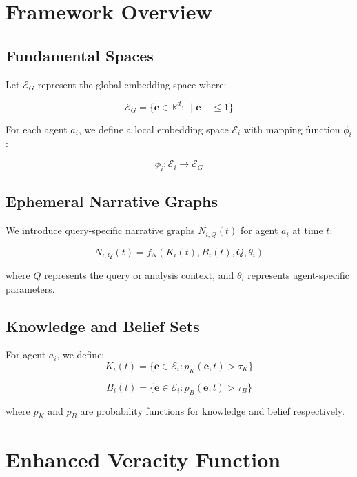 \documentclass[12pt, a4paper]{article}
\begin{document}
\section{Framework Overview}
\subsection{Fundamental Spaces}
Let $\mathcal{E}_G$ represent the global embedding space where:

\begin{equation}
\mathcal{E}_G = \{\mathbf{e} \in \mathbb{R}^d : \|\mathbf{e}\| \leq 1\}
\end{equation}

For each agent $a_i$, we define a local embedding space $\mathcal{E}_i$ with mapping function $\phi_i$:

\begin{equation}
\phi_i: \mathcal{E}_i \rightarrow \mathcal{E}_G
\end{equation}

\subsection{Ephemeral Narrative Graphs}
We introduce query-specific narrative graphs $N_{i,Q}(t)$ for agent $a_i$ at time $t$:

\begin{equation}
N_{i,Q}(t) = f_N(K_i(t), B_i(t), Q, \theta_i)
\end{equation}

where $Q$ represents the query or analysis context, and $\theta_i$ represents agent-specific parameters.

\subsection{Knowledge and Belief Sets}
For agent $a_i$, we define:
\begin{equation}
K_i(t) = \{\mathbf{e} \in \mathcal{E}_i : p_K(\mathbf{e}, t) > \tau_K\}
\end{equation}

\begin{equation}
B_i(t) = \{\mathbf{e} \in \mathcal{E}_i : p_B(\mathbf{e}, t) > \tau_B\}
\end{equation}

where $p_K$ and $p_B$ are probability functions for knowledge and belief respectively.

\section{Enhanced Veracity Function}
\end{document}
